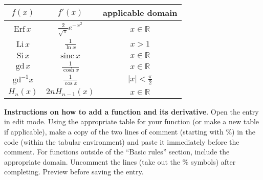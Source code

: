 \documentclass[12pt]{article}
\begin{document}
\begin{center}
\begin{tabular}{|c|c|c|}
\hline
$f(x)$ & $f'(x)$ & applicable domain \\
\hline\hline
$\mbox{Erf}\,x\,$ & $\displaystyle\frac{2}{\sqrt{\pi}}e^{-x^2}$ & $x\in \mathbb{R}$ \\
\hline
$\mbox{Li}\,x$ & $\displaystyle\frac{1}{\ln{x}}$ & $x > 1$ \\
\hline
$\mbox{Si}\,x$ & $\displaystyle\mbox{sinc}\,x$ & $x \in \mathbb{R}$ \\
\hline
$\mbox{gd}\,x$ & $\displaystyle\frac{1}{\cosh{x}}$ &  $x \in \mathbb{R}$\\
\hline 
$\mbox{gd}^{-1}x$ & $\displaystyle\frac{1}{\cos{x}}$ &  $|x| < \frac{\pi}{2}$\\
\hline 
$H_n(x)$ & $2nH_{n-1}(x)$ & $x \in \mathbb{R}$ \\
 \hline 


\end{tabular}
\end{center}




\textbf{Instructions on how to add a function and its derivative}.  Open the entry in edit mode.  Using the appropriate table for your function (or make a new table if applicable), make a copy of the two lines of comment (starting with \%) in the code (within the tabular environment) and paste it immediately before the comment.  For functions outside of the ``Basic rules'' section, include the appropriate domain.  Uncomment the lines (take out the \% symbols) after completing.  Preview before saving the entry.
\end{document}
